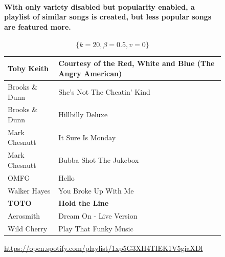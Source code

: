 \documentclass[a4paper, 12pt]{report}
\begin{document}
\begin{figure}[H]
\paragraph{With only variety disabled but popularity enabled, a playlist of similar songs is created, but less popular songs are featured more.}
\[\{k = 20, \beta = 0.5, v = 0\}\]
    \begin{center}
        \begin{tabulary}{\linewidth}{|@{\makebox[2em][c]{\rownumber}}|L|L|} 
            \hline
            Toby Keith & Courtesy of the Red, White and Blue (The Angry American) \\ 
            \hline
            Brooks \& Dunn & She's Not The Cheatin' Kind \\
            \hline
            Brooks \& Dunn & Hillbilly Deluxe \\
            \hline
            Mark Chesnutt & It Sure Is Monday \\
            \hline
            Mark Chesnutt & Bubba Shot The Jukebox \\
            \hline
            OMFG & Hello \\
            \hline
            Walker Hayes & You Broke Up With Me \\
            \hline
            \textbf{TOTO} & \textbf{Hold the Line} \\
            \hline
            Aerosmith & Dream On - Live Version \\
            \hline
            Wild Cherry & Play That Funky Music \\
            \hline
        \end{tabulary}
    \caption{\url{https://open.spotify.com/playlist/1xp5G3XH4TIEK1V5giaXDl}}
    \end{center}
\end{figure}
\end{document}
